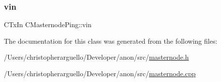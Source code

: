 \subsubsection{\texorpdfstring{vin}{vin}}
{\footnotesize\ttfamily C\+Tx\+In C\+Masternode\+Ping\+::vin}



The documentation for this class was generated from the following files\+:\begin{DoxyCompactItemize}
\item 
/\+Users/christopherarguello/\+Developer/anon/src/\mbox{\hyperlink{masternode_8h}{masternode.\+h}}\item 
/\+Users/christopherarguello/\+Developer/anon/src/\mbox{\hyperlink{masternode_8cpp}{masternode.\+cpp}}\end{DoxyCompactItemize}

